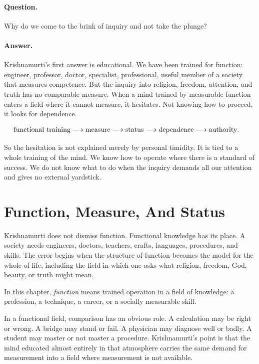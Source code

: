 \paragraph{Question.}
Why do we come to the brink of inquiry and not take the plunge?

\paragraph{Answer.}
Krishnamurti's first answer is educational. We have been trained for function: engineer, professor, doctor, specialist, professional, useful member of a society that measures competence. But the inquiry into religion, freedom, attention, and truth has no comparable measure. When a mind trained by measurable function enters a field where it cannot measure, it hesitates. Not knowing how to proceed, it looks for dependence.

\begin{align}
\hbox{functional training}
&\longrightarrow \hbox{measure}
\longrightarrow \hbox{status}
\longrightarrow \hbox{dependence}
\longrightarrow \hbox{authority}.
\end{align}

So the hesitation is not explained merely by personal timidity. It is tied to a whole training of the mind. We know how to operate where there is a standard of success. We do not know what to do when the inquiry demands all our attention and gives no external yardstick.

\section{Function, Measure, And Status}

Krishnamurti does not dismiss function. Functional knowledge has its place. A society needs engineers, doctors, teachers, crafts, languages, procedures, and skills. The error begins when the structure of function becomes the model for the whole of life, including the field in which one asks what religion, freedom, God, beauty, or truth might mean.

\begin{definition}
In this chapter, \emph{function} means trained operation in a field of knowledge: a profession, a technique, a career, or a socially measurable skill.
\end{definition}

In a functional field, comparison has an obvious role. A calculation may be right or wrong. A bridge may stand or fail. A physician may diagnose well or badly. A student may master or not master a procedure. Krishnamurti's point is that the mind educated almost entirely in that atmosphere carries the same demand for measurement into a field where measurement is not available.

